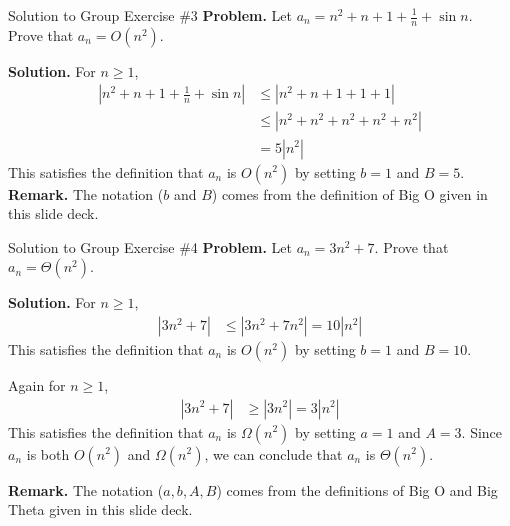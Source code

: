 \documentclass[10pt]{beamer}
\begin{document}
\begin{frame}{Solution to Group Exercise \#3}
\textbf{Problem.} Let $a_n = n^2 + n + 1 + \frac{1}{n} + \sin n$. Prove that $a_n = O(n^2)$.

\vfill 
\textbf{Solution.}
%
For $n \geq 1$,
\begin{align*}
|n^2 + n + 1 + \frac{1}{n} + \sin n| &\leq |n^2 + n + 1 + 1 + 1| \\
& \leq |n^2 + n^2  + n^2  + n^2  + n^2 | \\
&= 5 |n^2|
\end{align*}
This satisfies the definition that  $a_n$ is $O(n^2)$ by setting $b=1$ and $B=5$. 
\vfill 
\textbf{Remark.} The notation ($b$ and $B$) comes from the definition of Big O given in this slide deck.

\end{frame}


\begin{frame}{Solution to Group Exercise \#4}
\textbf{Problem.} Let $a_n = 3n^2 + 7$. Prove that $a_n = \Theta (n^2)$.

\vfill 
\textbf{Solution.}
%
For $n \geq 1$,
\begin{align*}
|3n^2 + 7| &\leq |3n^2 + 7n^2| = 10 |n^2| 
\end{align*}
%
This satisfies the definition that  $a_n$ is $O(n^2)$ by setting $b=1$ and $B=10$.
\vfill 

Again for $n \geq 1$,
\begin{align*}
|3n^2 + 7| &\geq |3n^2| = 3 |n^2| 
\end{align*}
%
This satisfies the definition that  $a_n$ is $\Omega(n^2)$ by setting $a=1$ and $A=3$. 
\vfill 
Since $a_n$ is both $O(n^2)$ and $\Omega(n^2)$, we can conclude that $a_n$ is $\Theta(n^2)$.

\vfill 
\textbf{Remark.} The notation ($a,b,A,B$) comes from the definitions of Big O and Big Theta given in this slide deck.


\end{frame}
\end{document}
